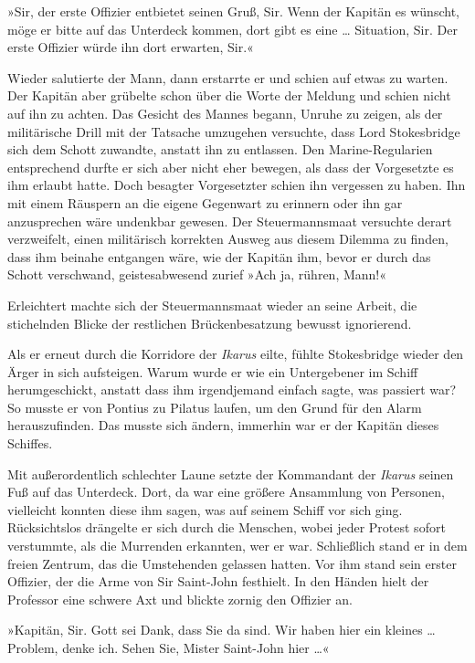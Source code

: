 »Sir, der erste Offizier entbietet seinen Gruß, Sir. Wenn der
Kapitän es wünscht, möge er bitte auf das Unterdeck kommen, dort
gibt es eine \ldots{} Situation, Sir. Der erste Offizier würde ihn dort
erwarten, Sir.«

Wieder salutierte der Mann, dann erstarrte er und schien auf etwas
zu warten. Der Kapitän aber grübelte schon über die Worte der
Meldung und schien nicht auf ihn zu achten. Das Gesicht des Mannes
begann, Unruhe zu zeigen, als der militärische Drill mit der
Tatsache umzugehen versuchte, dass Lord Stokesbridge sich dem
Schott zuwandte, anstatt ihn zu entlassen. Den Marine-Regularien
entsprechend durfte er sich aber nicht eher bewegen, als dass der
Vorgesetzte es ihm erlaubt hatte. Doch besagter Vorgesetzter schien
ihn vergessen zu haben. Ihn mit einem Räuspern an die eigene
Gegenwart zu erinnern oder ihn gar anzusprechen wäre undenkbar
gewesen. Der Steuermannsmaat versuchte derart verzweifelt, einen
militärisch korrekten Ausweg aus diesem Dilemma zu finden, dass ihm
beinahe entgangen wäre, wie der Kapitän ihm, bevor er durch das
Schott verschwand, geistesabwesend zurief »Ach ja, rühren, Mann!«

Erleichtert machte sich der Steuermannsmaat wieder an seine Arbeit,
die stichelnden Blicke der restlichen Brückenbesatzung bewusst
ignorierend.

Als er erneut durch die Korridore der \emph{Ikarus} eilte, fühlte
Stokesbridge wieder den Ärger in sich aufsteigen. Warum wurde er
wie ein Untergebener im Schiff herumgeschickt, anstatt dass ihm
irgendjemand einfach sagte, was passiert war? So musste er von
Pontius zu Pilatus laufen, um den Grund für den Alarm
herauszufinden. Das musste sich ändern, immerhin war er der Kapitän
dieses Schiffes.

\bigpar

Mit außerordentlich schlechter Laune setzte der Kommandant der
\emph{Ikarus} seinen Fuß auf das Unterdeck. Dort, da war eine
größere Ansammlung von Personen, vielleicht konnten diese ihm
sagen, was auf seinem Schiff vor sich ging. Rücksichtslos drängelte
er sich durch die Menschen, wobei jeder Protest sofort verstummte,
als die Murrenden erkannten, wer er war. Schließlich stand er in
dem freien Zentrum, das die Umstehenden gelassen hatten. Vor ihm
stand sein erster Offizier, der die Arme von Sir Saint-John
festhielt. In den Händen hielt der Professor eine schwere Axt und
blickte zornig den Offizier an.

»Kapitän, Sir. Gott sei Dank, dass Sie da sind. Wir haben hier ein
kleines \ldots{} Problem, denke ich. Sehen Sie, Mister Saint-John hier
\ldots{}«

